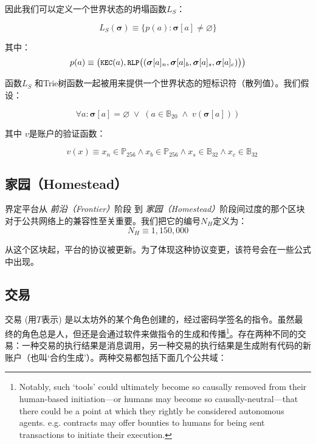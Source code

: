 \documentclass[UTF8,nofonts]{ctexart}
\makeatletter
\newcommand{\firsthomesteadblock}{\ensuremath{N_H}}
\newcommand*\eg{e.g.\@\xspace}
\makeatother
\begin{document}
\begin{multicols}{2}
因此我们可以定义一个世界状态的坍塌函数$L_S$：

\begin{equation}
L_S(\boldsymbol{\sigma}) \equiv \{ p(a): \boldsymbol{\sigma}[a] \neq \varnothing \}
\end{equation}

其中：
\begin{equation}
p(a) \equiv  \big(\texttt{\small KEC}(a), \texttt{\small RLP}\big( (\boldsymbol{\sigma}[a]_n, \boldsymbol{\sigma}[a]_b, \boldsymbol{\sigma}[a]_s, \boldsymbol{\sigma}[a]_c) \big) \big)
\end{equation}

函数$L_S$ 和Trie树函数一起被用来提供一个世界状态的短标识符（散列值）。我们假设：

\begin{equation}
\forall a: \boldsymbol{\sigma}[a] = \varnothing \; \vee \; (a \in \mathbb{B}_{20} \; \wedge \; v(\boldsymbol{\sigma}[a]))
\end{equation}

其中 $v$是账户的验证函数：

\begin{equation}
\quad v(x) \equiv x_n \in \mathbb{P}_{256} \wedge x_b \in \mathbb{P}_{256} \wedge x_s \in \mathbb{B}_{32} \wedge x_c \in \mathbb{B}_{32}
\end{equation}



\subsection{家园（Homestead）} \label{ch:homestead}

界定平台从 {\it 前沿（Frontier）}阶段 到 {\it 家园（Homestead）}阶段间过度的那个区块对于公共网络上的兼容性至关重要。我们把它的编号\firsthomesteadblock 定义为：
\begin{equation}
\firsthomesteadblock \equiv 1,\! 150,\! 000
\end{equation}

从这个区块起，平台的协议被更新。为了体现这种协议变更，该符号会在一些公式中出现。

\subsection{交易} \label{ch:transaction}

交易 (用$T$表示) 是以太坊外的某个角色创建的，经过密码学签名的指令。虽然最终的角色总是人，但还是会通过软件来做指令的生成和传播\footnote{Notably, such `tools' could ultimately become so causally removed from their human-based initiation---or humans may become so causally-neutral---that there could be a point at which they rightly be considered autonomous agents. \eg contracts may offer bounties to humans for being sent transactions to initiate their execution.}。存在两种不同的交易：一种交易的执行结果是消息调用，另一种交易的执行结果是生成附有代码的新账户（也叫`合约生成'）。两种交易都包括下面几个公共域：


\end{multicols}
\end{document}
